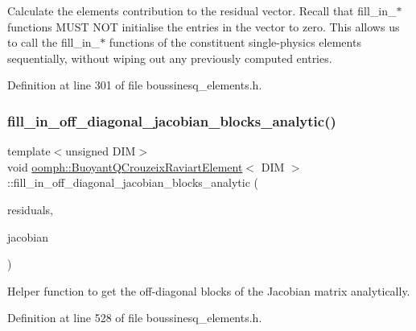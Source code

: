 Calculate the element\textquotesingle{}s contribution to the residual vector. Recall that fill\+\_\+in\+\_\+$\ast$ functions M\+U\+ST N\+OT initialise the entries in the vector to zero. This allows us to call the fill\+\_\+in\+\_\+$\ast$ functions of the constituent single-\/physics elements sequentially, without wiping out any previously computed entries. 



Definition at line 301 of file boussinesq\+\_\+elements.\+h.

\mbox{\label{classoomph_1_1BuoyantQCrouzeixRaviartElement_aa344d9c1a36501baefc4afd56f227b94}} 
\subsubsection{\texorpdfstring{fill\+\_\+in\+\_\+off\+\_\+diagonal\+\_\+jacobian\+\_\+blocks\+\_\+analytic()}{fill\_in\_off\_diagonal\_jacobian\_blocks\_analytic()}}
{\footnotesize\ttfamily template$<$unsigned D\+IM$>$ \\
void \hyperlink{classoomph_1_1BuoyantQCrouzeixRaviartElement}{oomph\+::\+Buoyant\+Q\+Crouzeix\+Raviart\+Element}$<$ D\+IM $>$\+::fill\+\_\+in\+\_\+off\+\_\+diagonal\+\_\+jacobian\+\_\+blocks\+\_\+analytic (\begin{DoxyParamCaption}\item[{Vector$<$ double $>$ \&}]{residuals,  }\item[{Dense\+Matrix$<$ double $>$ \&}]{jacobian }\end{DoxyParamCaption})\hspace{0.3cm}{\ttfamily [inline]}}



Helper function to get the off-\/diagonal blocks of the Jacobian matrix analytically. 



Definition at line 528 of file boussinesq\+\_\+elements.\+h.



